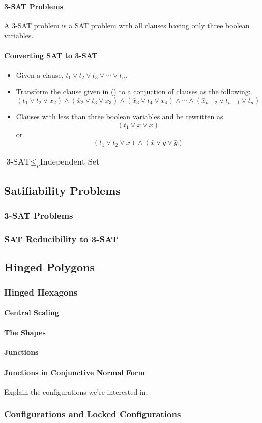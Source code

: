\paragraph{3-SAT Problems}
A 3-SAT problem is a SAT problem with all clauses having only three boolean variables. 
\paragraph{Converting SAT to 3-SAT}
\begin{itemize}
\item[\rn{1}] Given a clause, $t_1 \vee t_2 \vee t_3 \vee \cdots \vee t_n$.
\item[\rn{2}] Transform the clause given in () to a conjuction of clauses as the following:
$$\left( t_1 \vee t_2 \vee x_2 \right)\wedge\left( \bar{x}_2 \vee t_3 \vee x_3 \right)\wedge\left( \bar{x}_3 \vee t_4 \vee x_4 \right)\wedge \cdots \wedge \left( \bar{x}_{n-2} \vee t_{n-1} \vee t_n \right)$$
\item[\rn{3}] Clauses with less than three boolean variables and be rewritten as $$\left( t_1 \vee x \vee \bar{x} \right) $$ or $$\left( t_1 \vee t_2 \vee x \right)\wedge \left( \bar{x}  \vee y \vee \bar{y} \right)$$
\end{itemize}  
\subsubsection{$\text{3-SAT} \leq_p \text{Independent Set}$}


\subsection{Satifiability Problems}
\subsubsection{3-SAT Problems}
\subsubsection{SAT Reducibility to 3-SAT}
\subsection{Hinged Polygons}
\subsubsection{Hinged Hexagons}
\paragraph{Central Scaling}
\paragraph{The Shapes}
\paragraph{Junctions}
\paragraph{Junctions in Conjunctive Normal Form}
Explain the configurations we're interested in.
\subsubsection{Configurations and Locked Configurations}